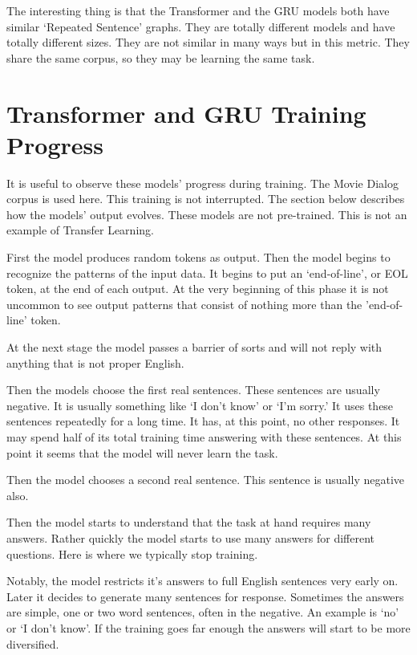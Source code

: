 The interesting thing is that the Transformer and the GRU models both have similar `Repeated Sentence' graphs. They are totally different models and have totally different sizes. They are not similar in many ways but in this metric. They share the same corpus, so they may be learning the same task.

\section{Transformer and GRU Training Progress}

It is useful to observe these models' progress during training. The Movie Dialog corpus is used here. This training is not interrupted. The section below describes how the models' output evolves. These models are not pre-trained. This is not an example of Transfer Learning.

First the model produces random tokens as output. Then the model begins to recognize the patterns of the input data. It begins to put an `end-of-line', or \ac{EOL} token, at the end of each output. At the very beginning of this phase it is not uncommon to see output patterns that consist of nothing more than the 'end-of-line' token. 

At the next stage the model passes a barrier of sorts and will not reply with anything that is not proper English. 

Then the models choose the first real sentences. These sentences are usually negative. It is usually something like `I don't know' or `I'm sorry.' It uses these sentences repeatedly for a long time. It has, at this point, no other responses. It may spend half of its total training time answering with these sentences. At this point it seems that the model will never learn the task.

Then the model chooses a second real sentence. This sentence is usually negative also. 

Then the model starts to understand that the task at hand requires many answers. Rather quickly the model starts to use many answers for different questions. Here is where we typically stop training.

Notably, the model restricts it's answers to full English sentences very early on. Later it decides to generate many sentences for response. Sometimes the answers are simple, one or two word sentences, often in the negative. An example is `no' or `I don't know'. If the training goes far enough the answers will start to be more diversified. 


